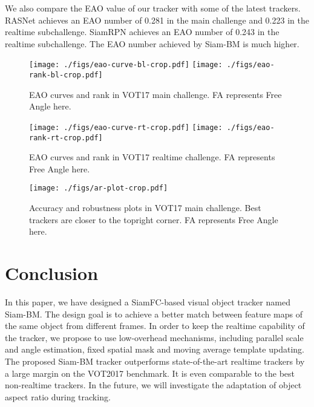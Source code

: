 \documentclass[runningheads]{llncs}
\begin{document}
We also compare the EAO value of our tracker with some of the latest trackers. RASNet \cite{RASNet} achieves an EAO number of 0.281 in the main challenge and 0.223 in the realtime subchallenge. SiamRPN \cite{SiamRPN} achieves an EAO number of 0.243 in the realtime subchallenge. The EAO number achieved by Siam-BM is much higher. 

\begin{figure}[th!]
    \begin{center}
    \texttt{[image: ./figs/eao-curve-bl-crop.pdf]}
    \texttt{[image: ./figs/eao-rank-bl-crop.pdf]}
    \end{center}
    \caption{EAO curves and rank in VOT17 main challenge. FA represents Free Angle here.}
    \label{fig:eao-bl}
\end{figure}

\begin{figure}[th!]
    \begin{center}
    \texttt{[image: ./figs/eao-curve-rt-crop.pdf]}
    \texttt{[image: ./figs/eao-rank-rt-crop.pdf]}
    \end{center}
    \caption{EAO curves and rank in VOT17 realtime challenge. FA represents Free Angle here.}
    \label{fig:eao-rt}
\end{figure}

\begin{figure}[th!]
    \begin{center}
    \texttt{[image: ./figs/ar-plot-crop.pdf]}
    \end{center}
    \caption{Accuracy and robustness plots in VOT17 main challenge. Best trackers are closer to the topright corner. FA represents Free Angle here.}
    \label{fig:ar-plot}
\end{figure}

\section{Conclusion} \label{sec:conclude}
In this paper, we have designed a SiamFC-based visual object tracker named Siam-BM. The design goal is to achieve a better match between feature maps of the same object from different frames. In order to keep the realtime capability of the tracker, we propose to use low-overhead mechanisms, including parallel scale and angle estimation, fixed spatial mask and moving average template updating. The proposed Siam-BM tracker outperforms state-of-the-art realtime trackers by a large margin on the VOT2017 benchmark. It is even comparable to the best non-realtime trackers. In the future, we will investigate the adaptation of object aspect ratio during tracking.  
\end{document}
